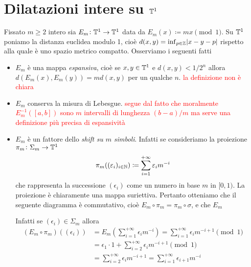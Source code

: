 \section{Dilatazioni intere su $ \mathbb{T}^1 $}
Fissato $ m \geq 2 $ intero sia $ E_m \colon \mathbb{T}^1 \to \mathbb{T}^1 $ data da $ E_m(x) \coloneqq mx \pmod{1} $. Su $ \mathbb{T}^1 $ poniamo la distanza euclidea modulo 1, cioè $ d(x, y) = \inf_{p \in \mathbb{Z}} \abs{x - y - p} $ rispetto alla quale è uno spazio metrico compatto. Osserviamo i seguenti fatti
\begin{itemize}
    \item $ E_m $ è una mappa \emph{espansiva}, cioè se $ x, y \in \mathbb{T}^1 $ e $ d(x, y) < 1/2^n $ allora $ d(E_m(x), E_m(y)) = m d(x, y) $ per un qualche $ n $. \textcolor{red}{la definizione non è chiara}
    \item $ E_m $ conserva la misura di Lebesgue. \textcolor{red}{segue dal fatto che moralmente $ E_m^{-1}([a, b]) $ sono $ m $ intervalli di lunghezza $ (b - a)/m $ ma serve una definizione più precisa di espansività}
    \item $ E_m $ è un fattore dello \emph{shift su $ m $ simboli}. Infatti se consideriamo la proiezione $ \pi_m \colon \Sigma_m \to \mathbb{T}^1 $
    \[
    \pi_m((\varepsilon_i)_{i \in \mathbb{N}}) \coloneqq \sum_{i = 1}^{+\infty} \varepsilon_i m^{-i}
    \]
    che rappresenta la successione $ (\epsilon_i) $ come un numero in base $ m $ in $ [0, 1) $. La proiezione è chiaramente una mappa suriettiva. Pertanto otteniamo che il seguente diagramma è commutativo, cioè $ E_m \circ \pi_m = \pi_m \circ \sigma $, e che $ E_m $
    \begin{center}
    \end{center}
    Infatti se $ (\epsilon_i) \in \Sigma_m $ allora
    \begin{align*}
        (E_m \circ \pi_m)((\epsilon_i)) & = E_m\left(\sum_{i = 1}^{+\infty} \epsilon_i m^{-i}\right)  = \sum_{i = 1}^{+\infty} \epsilon_i m^{-i+1} \pmod{1} \\
        & = \epsilon_1 \cdot 1 + \sum_{i = 2}^{+\infty} \epsilon_i m^{-i+1} \pmod{1} \\
        & = \sum_{i = 2}^{+\infty} \epsilon_i m^{-i+1} = \sum_{i = 1}^{+\infty} \epsilon_{i + 1} m^{-i}
    \end{align*}

\end{itemize}
